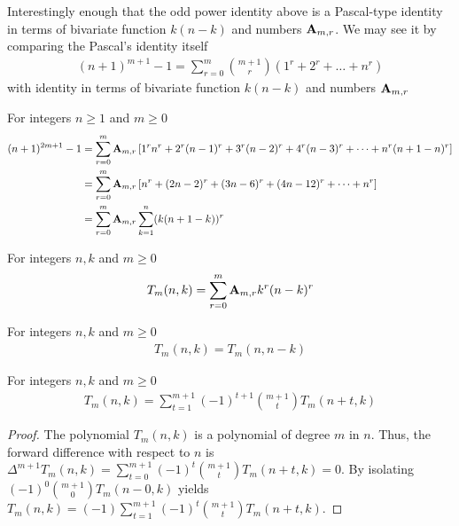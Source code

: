 Interestingly enough that the odd power identity above is a Pascal-type identity
in terms of bivariate function $k(n-k)$ and numbers ${\mathbf{A}} \sb{m,r}$.
We may see it by comparing the Pascal's identity itself~\cite{macmillan2011proofs}
\begin{align*}
(n+1)
    ^{m+1}-1 = \sum_{r=0}^{m} \binom{m+1}{r} \left( 1^{r}+2^{r} + \dots + n^{r} \right)
\end{align*}
with identity in terms of bivariate function $k(n-k)$ and numbers ${\mathbf{A}} \sb{m,r}$
\begin{corollary} For integers $n \geq 1$ and $m\geq 0$
    \begin{align*}
    (n+1)
        ^{2m+1} - 1
        &= \sum_{r=0}^{m} {\mathbf{A}} \sb{m,r} \left[ 1^r n^r + 2^r (n-1)^r + 3^r (n-2)^r + 4^r (n-3)^r + \cdots + n^r (n+1-n)^r  \right] \\
        &= \sum_{r=0}^{m} {\mathbf{A}} \sb{m,r} \left[ n^r + (2n-2)^r + (3n-6)^r + (4n-12)^r + \cdots + n^r  \right] \\
        &= \sum_{r=0}^{m} {\mathbf{A}} \sb{m,r} \sum_{k=1}^{n} (k (n+1-k))^r
    \end{align*}
\end{corollary}
\begin{definition}
    For integers $n,k$ and $m \geq 0$
    \label{def:bivariate-sum-Tm}
    \begin{align*}
        T_{m}(n,k) = \sum_{r=0}^{m} {\mathbf{A}} \sb{m,r} k^r (n-k)^r
    \end{align*}
\end{definition}

\begin{proposition}[Symmetry of $T_m$]
    \label{prop:Tm-symmetry}
    For integers $n,k$ and $m\geq 0$
    \begin{align*}
        T_{m} (n, k) = T_{m} (n, n-k)
    \end{align*}
\end{proposition}
\begin{proposition}
    For integers $n,k$ and $m\geq 0$
    \label{prop:Tm-recurrence-forward}
    \begin{align*}
        T_{m} (n,k) = \sum_{t=1}^{m+1} (-1)^{t+1} \binom{m+1}{t} T_{m} (n+t, k)
    \end{align*}
    \begin{proof}
        The polynomial $T_{m} (n,k)$ is a polynomial of degree $m$ in $n$.
        Thus, the forward difference with respect to $n$ is
        $\Delta^{m+1} T_{m} (n, k) = \sum_{t=0}^{m+1} (-1)^{t} \binom{m+1}{t} T_{m} (n+t, k) = 0$.
        By isolating $(-1)^{0} \binom{m+1}{0} T_{m} (n-0, k)$ yields
        $T_{m} (n, k) = (-1) \sum_{t=1}^{m+1} (-1)^{t} \binom{m+1}{t} T_{m} (n+t, k)$.
    \end{proof}
\end{proposition}


